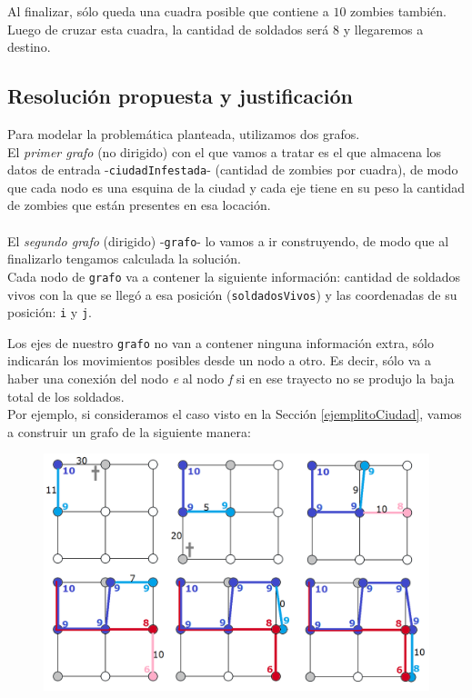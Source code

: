 Al finalizar, s\'olo queda una cuadra posible que contiene a $10$ zombies tambi\'en. Luego de cruzar esta cuadra, la cantidad de soldados ser\'a $8$ y llegaremos a destino.



\newpage
\subsection{Resoluci\'on propuesta y justificaci\'on}

Para modelar la problem\'atica planteada, utilizamos dos grafos.\\

El \emph{primer grafo} (no dirigido) con el que vamos a tratar es el que almacena los datos de entrada -\texttt{ciudadInfestada}- (cantidad de zombies por cuadra), de modo que cada nodo es una esquina de la ciudad y cada eje tiene en su peso la cantidad de zombies que est\'an presentes en esa locaci\'on.\\
\\

El \emph{segundo grafo} (dirigido) -\texttt{grafo}- lo vamos a ir construyendo, de modo que al finalizarlo tengamos calculada la soluci\'on.\\

Cada nodo de \texttt{grafo} va a contener la siguiente informaci\'on: cantidad de soldados vivos con la que se lleg\'o a esa posici\'on (\texttt{soldadosVivos}) y las coordenadas de su posici\'on: \texttt{i} y \texttt{j}.

Los ejes de nuestro \texttt{grafo} no van a contener ninguna informaci\'on extra, s\'olo indicar\'an los movimientos posibles desde un nodo a otro. 
Es decir, s\'olo va a haber una conexi\'on del nodo \emph{e} al nodo \emph{f} si en ese trayecto no se produjo la baja total de los soldados.\\

Por ejemplo, si consideramos el caso visto en la Secci\'on \ref{ejemplitoCiudad}, vamos a construir un grafo de la siguiente manera:

  \begin{figure}[h!]
   \begin{center}
 	\includegraphics[scale=0.4]{imagenes/ej2/todos.png}
   \end{center}
 \end{figure}
 

